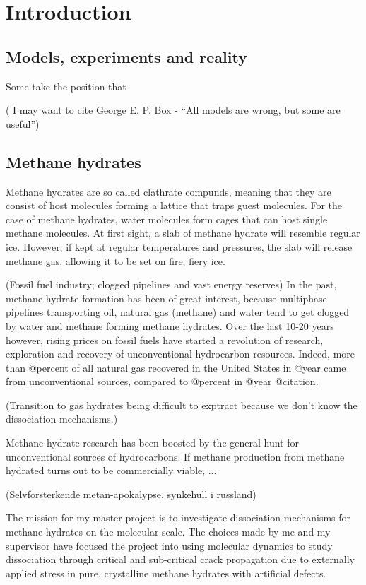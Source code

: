 \chapter{Introduction}
\section{Models, experiments and reality}
Some take the position that 

( I may want to cite George E. P. Box - ``All models are wrong, but some are useful'')

\section{Methane hydrates}
Methane hydrates are so called clathrate compunds, meaning that they are consist of host molecules forming a lattice that traps guest molecules. For the case of methane hydrates, water molecules form cages that can host single methane molecules. At first sight, a slab of methane hydrate will resemble regular ice. However, if kept at regular temperatures and pressures, the slab will release methane gas, allowing it to be set on fire; fiery ice. 

(Fossil fuel industry; clogged pipelines and vast energy reserves)
In the past, methane hydrate formation has been of great interest, because multiphase pipelines transporting oil, natural gas (methane) and water tend to get clogged by water and methane forming methane hydrates. Over the last 10-20 years however, rising prices on fossil fuels have started a revolution of research, exploration and recovery of unconventional hydrocarbon resources. Indeed, more than @percent of all natural gas recovered in the United States in @year came from unconventional sources, compared to @percent in @year @citation. 

(Transition to gas hydrates being difficult to exptract because we don't know the dissociation mechanisms.)

Methane hydrate research has been boosted by the general hunt for unconventional sources of hydrocarbons. If methane production from methane hydrated turns out to be commercially viable, ...

(Selvforsterkende metan-apokalypse, synkehull i russland)

The mission for my master project is to investigate dissociation mechanisms for methane hydrates on the molecular scale. The choices made by me and my supervisor have focused the project into using molecular dynamics to study dissociation through critical and sub-critical crack propagation due to externally applied stress in pure, crystalline methane hydrates with artificial defects. 


